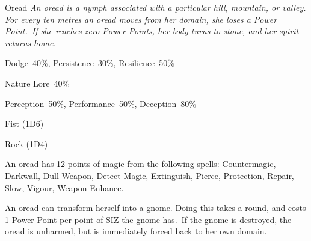\newpage

\begin{monsterbox}{Oread}
	\textit{An oread is a nymph associated with a particular hill, mountain, or valley. For every ten metres an oread moves from her domain, she loses a Power Point. If she reaches zero Power Points, her body turns to stone, and her spirit returns home.}\\
	\rpghline
	\basics[%
        hitpoints  = 11, 
	majorwound = 6,
	damagemodifier = 0,
	powerpoints = 25,
	movementrate = 15m,
	armor = None,
	plunderrating = 1
	]
	\rpghline%
	\stats[ %
		STR = 2D6    (7),
		CON = 3D6+3  (12),
		DEX = 3D6+6  (17),
		SIZ = 2D6+3  (10),
		INT = 3D6+3  (14),
		POW = 2D6+15 (22),
		CHA = 2D6+9  (15)
	]
	\rpghline%
	\begin{rpg-monsteraction}[Resistances]
		Dodge~40\%, Persistence~30\%, Resilience~50\%
	\end{rpg-monsteraction}
	\begin{rpg-monsteraction}[Knowledge]
		Nature Lore~40\%
	\end{rpg-monsteraction}
	\begin{rpg-monsteraction}[Practical]
		Perception~50\%, Performance~50\%, Deception~80\%
	\end{rpg-monsteraction}
	\begin{rpg-monsteraction}
		Fist (1D6)
	\end{rpg-monsteraction}
	\begin{rpg-monsteraction}
		Rock (1D4)
	\end{rpg-monsteraction}
	\begin{rpg-monsteraction}[Magic 70\%]
		An oread has 12 points of magic from the following spells: Countermagic, Darkwall, Dull Weapon, Detect Magic, Extinguish, Pierce, Protection, Repair, Slow, Vigour, Weapon Enhance.
	\end{rpg-monsteraction}
	\begin{rpg-monsteraction}
		An oread can transform herself into a gnome. Doing this takes a round, and costs 1 Power Point per point of SIZ the gnome has. If the gnome is destroyed, the oread is unharmed, but is immediately forced back to her own domain.
	\end{rpg-monsteraction}

\end{monsterbox}

